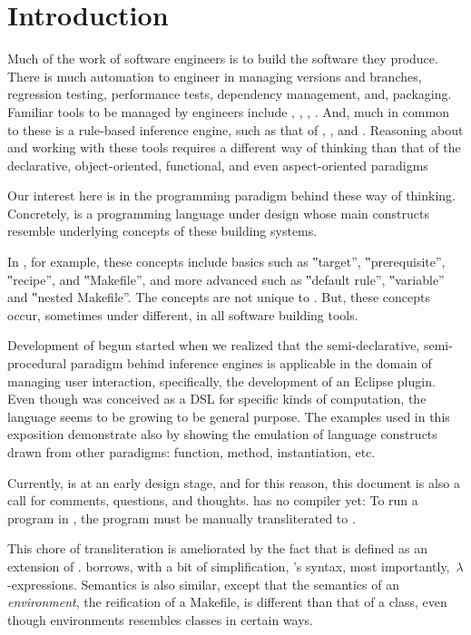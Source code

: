 \section{Introduction}

Much of the work of software engineers is to build the software they produce.
There is much automation to engineer in managing versions and branches,
regression testing, performance tests, dependency management, and, packaging.
Familiar tools to be managed by engineers include %
, , 
, . And, much in common to these is a
rule-based inference engine, such as that of , , and
. Reasoning about and working with these tools requires a different
way of thinking than that of the declarative, object-oriented, functional, and
even aspect-oriented paradigms

Our interest here is in the programming paradigm behind these way of thinking.
Concretely, \Reap is a programming language under design whose main constructs
resemble underlying concepts of these building systems.

In , for example, these concepts include basics such as ‟target”,
‟prerequisite”, ‟recipe”, and ‟Makefile”, and more advanced such as ‟default
rule”, ‟variable” and ‟nested Makefile”. The concepts are not unique to
. But, these concepts occur, sometimes under different, in all
software building tools.

Development of \Reap begun started when we realized that the semi-declarative,
semi-procedural paradigm behind inference engines is applicable in the domain
of managing user interaction, specifically, the development of an Eclipse
plugin. Even though \Reap was conceived as a DSL for specific kinds of
computation, the language seems to be growing to be general purpose.
The examples used in this exposition demonstrate \Reap also by showing the
emulation of language constructs drawn from other paradigms: function, method,
instantiation, etc.

Currently, \Reap is at an early design stage, and for this reason, this
document is also a call for comments, questions, and thoughts. \Reap has no
compiler yet: To run a program in \Reap, the program must be manually
transliterated to \Java.

This chore of transliteration is ameliorated by the fact that \Reap is defined
as an extension of \Java. \Reap borrows, with a bit of simplification, \Java's
syntax, most importantly,~$λ$-expressions. Semantics is also similar, except
that the semantics of an \emph{environment}, the \Reap reification of a
Makefile, is different than that of a \Java class, even though environments
resembles classes in certain ways.

